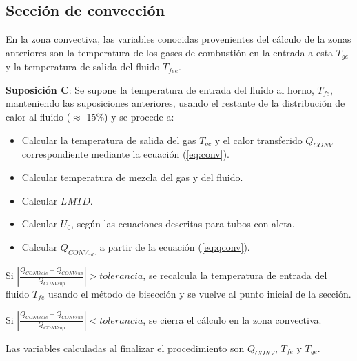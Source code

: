 \subsection{Sección de convección}
\par En la zona convectiva, las variables conocidas provenientes del cálculo de la zonas anteriores son la temperatura de los gases de combustión en la entrada a esta $T_{ge}$ y la temperatura de salida del fluido $T_{fee}$.
\par \textbf{Suposición C}: Se supone la temperatura de entrada del fluido al horno, $T_{fe}$, manteniendo las suposiciones anteriores, usando el restante de la distribución de calor al fluido ($\approx$ 15\%) y se procede a:
\begin{itemize}
\item Calcular la temperatura de salida del gas $T_{gc}$ y el calor transferido $Q_{CONV}$ correspondiente mediante la ecuación (\ref{eq:conv}).
\item Calcular temperatura de mezcla del gas y del fluido.
\item Calcular $LMTD$.
\item Calcular $U_0$, según las ecuaciones descritas para tubos con aleta.
\item Calcular $Q_{CONV_{calc}}$ a partir de la ecuación (\ref{eq:qconv}).
\end{itemize}
\par Si $|\frac{Q_{CONVcalc} - Q_{CONVsup}}{Q_{CONVsup}} | > tolerancia$, se recalcula la temperatura de entrada del fluido $T_{fe}$ usando el método de bisección y se vuelve al punto inicial de la sección.
\par Si $|\frac{Q_{CONVcalc} - Q_{CONVsup}}{Q_{CONVsup}} | < tolerancia$, se cierra el cálculo en la zona convectiva.
\par Las variables calculadas al finalizar el procedimiento son  $Q_{CONV}$, $T_{fe}$ y $T_{ge}$.

